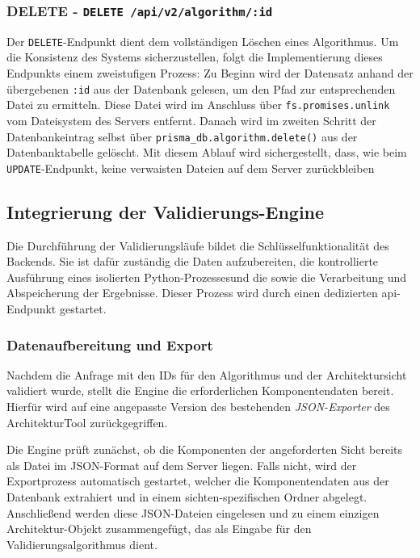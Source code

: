 \subsubsection*{DELETE - \texttt{DELETE /api/v2/algorithm/:id}}

Der \texttt{DELETE}-Endpunkt dient dem vollständigen Löschen eines Algorithmus. Um die Konsistenz des Systems sicherzustellen, folgt die Implementierung dieses Endpunkts einem zweistufigen Prozess: Zu Beginn wird der Datensatz anhand der übergebenen \texttt{:id} aus der Datenbank gelesen, um den Pfad zur entsprechenden Datei zu ermitteln. Diese Datei wird im Anschluss über \texttt{fs.promises.unlink} vom Dateisystem des Servers entfernt. Danach wird im zweiten Schritt der Datenbankeintrag selbst über \texttt{prisma\_db.algorithm.delete()} aus der Datenbanktabelle gelöscht. Mit diesem Ablauf wird sichergestellt, dass, wie beim \texttt{UPDATE}-Endpunkt, keine verwaisten Dateien auf dem Server zurückbleiben

\subsection{Integrierung der Validierungs-Engine}
\label{subsec:engine}

Die Durchführung der Validierungsläufe bildet die Schlüsselfunktionalität des Backends. Sie ist dafür zuständig die Daten aufzubereiten, die kontrollierte Ausführung eines isolierten Python-Prozessesund die sowie die Verarbeitung und Abspeicherung der Ergebnisse. Dieser Prozess wird durch einen dedizierten \gls{api}-Endpunkt gestartet.

\subsubsection*{Datenaufbereitung und Export}

Nachdem die Anfrage mit den IDs für den Algorithmus und der Architektursicht validiert wurde, stellt die Engine die erforderlichen Komponentendaten bereit. Hierfür wird auf eine angepasste Version des bestehenden \textit{JSON-Exporter} des ArchitekturTool zurückgegriffen.

Die Engine prüft zunächst, ob die Komponenten der angeforderten Sicht bereits als Datei im JSON-Format auf dem Server liegen. Falls nicht, wird der Exportprozess automatisch gestartet, welcher die Komponentendaten aus der Datenbank extrahiert und in einem sichten-spezifischen Ordner abgelegt. Anschließend werden diese JSON-Dateien eingelesen und zu einem einzigen Architektur-Objekt zusammengefügt, das als Eingabe für den Validierungsalgorithmus dient.

